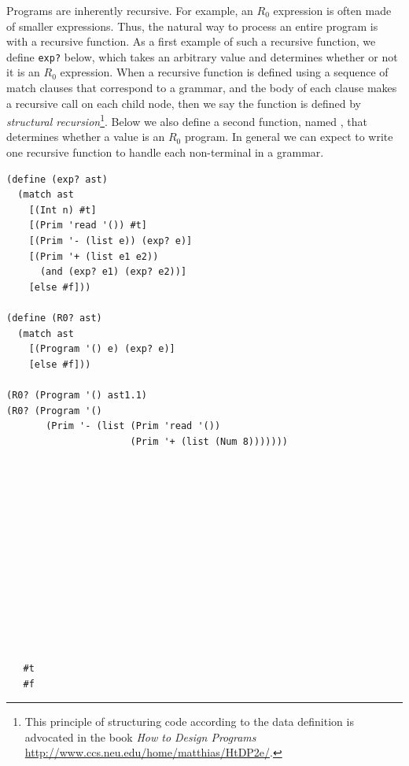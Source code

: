 \documentclass[11pt]{book}
\begin{document}
Programs are inherently recursive. For example, an $R_0$ expression is
often made of smaller expressions. Thus, the natural way to process an
entire program is with a recursive function.  As a first example of
such a recursive function, we define \texttt{exp?} below, which takes
an arbitrary value and determines whether or not it is an $R_0$
expression.
%
When a recursive function is defined using a sequence of match clauses
that correspond to a grammar, and the body of each clause makes a
recursive call on each child node, then we say the function is defined
by \emph{structural recursion}\footnote{This principle of structuring
  code according to the data definition is advocated in the book
  \emph{How to Design Programs}
  \url{http://www.ccs.neu.edu/home/matthias/HtDP2e/}.}. Below we also
define a second function, named , that determines whether a
value is an $R_0$ program.  In general we can expect to write one
recursive function to handle each non-terminal in a grammar.
%
\begin{center}
\begin{minipage}{0.7\textwidth}
\begin{lstlisting}
(define (exp? ast)
  (match ast
    [(Int n) #t]
    [(Prim 'read '()) #t]
    [(Prim '- (list e)) (exp? e)]
    [(Prim '+ (list e1 e2))
      (and (exp? e1) (exp? e2))]
    [else #f]))

(define (R0? ast)
  (match ast
    [(Program '() e) (exp? e)]
    [else #f]))

(R0? (Program '() ast1.1)
(R0? (Program '()
       (Prim '- (list (Prim 'read '())
                      (Prim '+ (list (Num 8)))))))
\end{lstlisting}
\end{minipage}
\vrule
\begin{minipage}{0.25\textwidth}
\begin{lstlisting}













   #t
   #f
\end{lstlisting}
\end{minipage}
\end{center}
\end{document}
